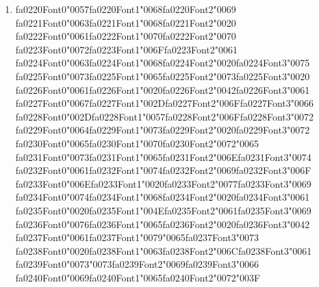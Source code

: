 \documentclass[12pt]{article}
\begin{document}
\begin{enumerate}[label=Q\arabic*.]
 \item {\csname fa0220Font0\endcsname\char"0057}{\csname fa0220Font1\endcsname\char"0068}{\csname fa0220Font2\endcsname\char"0069} {\csname fa0221Font0\endcsname\char"0063}{\csname fa0221Font1\endcsname\char"0068}{\csname fa0221Font2\endcsname\char"0020} {\csname fa0222Font0\endcsname\char"0061}{\csname fa0222Font1\endcsname\char"0070}{\csname fa0222Font2\endcsname\char"0070} {\csname fa0223Font0\endcsname\char"0072}{\csname fa0223Font1\endcsname\char"006F}{\csname fa0223Font2\endcsname\char"0061} {\csname fa0224Font0\endcsname\char"0063}{\csname fa0224Font1\endcsname\char"0068}{\csname fa0224Font2\endcsname\char"0020}{\csname fa0224Font3\endcsname\char"0075} {\csname fa0225Font0\endcsname\char"0073}{\csname fa0225Font1\endcsname\char"0065}{\csname fa0225Font2\endcsname\char"0073}{\csname fa0225Font3\endcsname\char"0020} {\csname fa0226Font0\endcsname\char"0061}{\csname fa0226Font1\endcsname\char"0020}{\csname fa0226Font2\endcsname\char"0042}{\csname fa0226Font3\endcsname\char"0061} {\csname fa0227Font0\endcsname\char"0067}{\csname fa0227Font1\endcsname\char"002D}{\csname fa0227Font2\endcsname\char"006F}{\csname fa0227Font3\endcsname\char"0066} {\csname fa0228Font0\endcsname\char"002D}{\csname fa0228Font1\endcsname\char"0057}{\csname fa0228Font2\endcsname\char"006F}{\csname fa0228Font3\endcsname\char"0072} {\csname fa0229Font0\endcsname\char"0064}{\csname fa0229Font1\endcsname\char"0073}{\csname fa0229Font2\endcsname\char"0020}{\csname fa0229Font3\endcsname\char"0072} {\csname fa0230Font0\endcsname\char"0065}{\csname fa0230Font1\endcsname\char"0070}{\csname fa0230Font2\endcsname\char"0072}{\char"0065} {\csname fa0231Font0\endcsname\char"0073}{\csname fa0231Font1\endcsname\char"0065}{\csname fa0231Font2\endcsname\char"006E}{\csname fa0231Font3\endcsname\char"0074} {\csname fa0232Font0\endcsname\char"0061}{\csname fa0232Font1\endcsname\char"0074}{\csname fa0232Font2\endcsname\char"0069}{\csname fa0232Font3\endcsname\char"006F} {\csname fa0233Font0\endcsname\char"006E}{\csname fa0233Font1\endcsname\char"0020}{\csname fa0233Font2\endcsname\char"0077}{\csname fa0233Font3\endcsname\char"0069} {\csname fa0234Font0\endcsname\char"0074}{\csname fa0234Font1\endcsname\char"0068}{\csname fa0234Font2\endcsname\char"0020}{\csname fa0234Font3\endcsname\char"0061} {\csname fa0235Font0\endcsname\char"0020}{\csname fa0235Font1\endcsname\char"004E}{\csname fa0235Font2\endcsname\char"0061}{\csname fa0235Font3\endcsname\char"0069} {\csname fa0236Font0\endcsname\char"0076}{\csname fa0236Font1\endcsname\char"0065}{\csname fa0236Font2\endcsname\char"0020}{\csname fa0236Font3\endcsname\char"0042} {\csname fa0237Font0\endcsname\char"0061}{\csname fa0237Font1\endcsname\char"0079}{\char"0065}{\csname fa0237Font3\endcsname\char"0073} {\csname fa0238Font0\endcsname\char"0020}{\csname fa0238Font1\endcsname\char"0063}{\csname fa0238Font2\endcsname\char"006C}{\csname fa0238Font3\endcsname\char"0061} {\csname fa0239Font0\endcsname\char"0073}{\char"0073}{\csname fa0239Font2\endcsname\char"0069}{\csname fa0239Font3\endcsname\char"0066} {\csname fa0240Font0\endcsname\char"0069}{\csname fa0240Font1\endcsname\char"0065}{\csname fa0240Font2\endcsname\char"0072}{\char"003F}

\end{enumerate}
\end{document}
